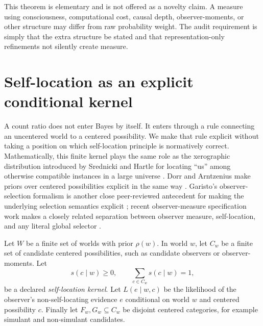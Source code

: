 \documentclass[11pt]{article}
\begin{document}
This theorem is elementary and is not offered as a novelty claim. A measure using consciousness, computational cost, causal depth, observer-moments, or other structure may differ from raw probability weight. The audit requirement is simply that the extra structure be stated and that representation-only refinements not silently create measure.

\section{Self-location as an explicit conditional kernel}\label{sec:selflocation}
A count ratio does not enter Bayes by itself. It enters through a rule connecting an uncentered world to a centered possibility. We make that rule explicit without taking a position on which self-location principle is normatively correct. Mathematically, this finite kernel plays the same role as the xerographic distribution introduced by Srednicki and Hartle for locating ``us'' among otherwise compatible instances in a large universe \citep{srednickihartle2013}. Dorr and Arntzenius make priors over centered possibilities explicit in the same way \citep{dorrarntzenius2017}. Garisto's observer-selection formalism is another close peer-reviewed antecedent for making the underlying selection semantics explicit \citep{garisto2020}; recent observer-measure specification work makes a closely related separation between observer measure, self-location, and any literal global selector \citep{uchida2026}.

Let $W$ be a finite set of worlds with prior $\rho(w)$. In world $w$, let $C_w$ be a finite set of candidate centered possibilities, such as candidate observers or observer-moments. Let
\[
s(c\mid w)\ge0,\qquad \sum_{c\in C_w}s(c\mid w)=1,
\]
be a declared \emph{self-location kernel}. Let $L(e\mid w,c)$ be the likelihood of the observer's non-self-locating evidence $e$ conditional on world $w$ and centered possibility $c$. Finally let $F_w,G_w\subseteq C_w$ be disjoint centered categories, for example simulant and non-simulant candidates.
\end{document}
